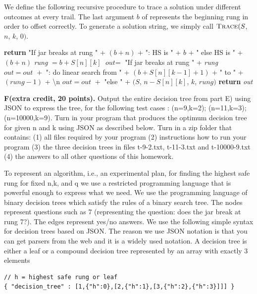 \documentclass[11pt]{article}
\theoremstyle{definition}
\theoremstyle{theorem}
\begin{document}
We define the following recursive procedure to trace a solution under different outcomes at every trail. The last argument $b$ of  represents the beginning rung in order to offset correctly. To generate a solution string, we simply call $\textproc{\textsc{Trace}}(S$, $n$, $k$, $0)$.
\begin{algorithmic}[1]
		\State \textbf{return} "If jar breaks at rung " + $(b + n)$ + ": HS is " +  $b$ + " else HS is " + $(b+n)$
	\EndIf
	\State \textit{rung} $= b + S[n][k]$
	\State $\textit{out} =$ "If jar breaks at rung " + \textit{rung}
	\State $\textit{out} = \textit{out } + $ ": do linear search from " + $(b + S[n][k-1] + 1)$ + " to " + $(\textit{rung} - 1)$ +  \textbackslash n  
	\State $\textit{out} = \textit{out } + $ "else " + $(S$, $n - S[n][k]$, $k$, $\textit{rung})$
	\State \textbf{return} \textit{out}
\EndFunction
\end{algorithmic}

\newpage
\noindent\textbf{F(extra credit, 20 points).} Output  the  entire  decision  tree  from  part  E)  using JSON  to  express  the  tree,  for  the  following  test  cases : (n=9,k=2); (n=11,k=3); (n=10000,k=9). Turn in your program that produces the optimum decision tree for given n and k using JSON as described below.  Turn in a zip folder that contains:  (1) all files required by your program (2) instructions how to run your program (3) the three decision trees in files t-9-2.txt, t-11-3.txt and t-10000-9.txt (4) the answers to all other questions of this homework.

To represent an algorithm, i.e., an experimental plan, for finding the highest safe rung for fixed n,k, and q we use a restricted programming language that is powerful enough to express what we need.  We use the programming language of binary decision trees which  satisfy  the  rules  of  a  binary  search  tree.   The  nodes  represent  questions  such as 7 (representing the question:  does the jar break at rung 7?).  The edges represent yes/no answers.  We use the following simple syntax for decision trees based on JSON. The reason we use JSON notation is that you can get parsers from the web and it is a widely used notation.  A decision tree is either a leaf or a compound decision tree represented by an array with exactly 3 elements

\begin{verbatim}
// h = highest safe rung or leaf
{ "decision_tree" : [1,{"h":0},[2,{"h":1},[3,{"h":2},{"h":3}]]] }
\end{verbatim}
\end{document}
